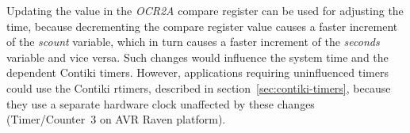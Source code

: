 Updating the value in the {\it{OCR2A}} compare register
can be used for adjusting the time, because decrementing the compare register
value causes a faster increment of the {\it{scount}} variable, which in turn causes
a faster increment of the {\it{seconds}} variable and vice versa.
Such changes would influence the system time and the dependent Contiki timers.
However, applications requiring uninfluenced timers
could use the Contiki rtimers, described in section~\ref{sec:contiki-timers},
because they use a separate hardware clock unaffected by these changes
(Timer/Counter~3 on AVR Raven platform).
